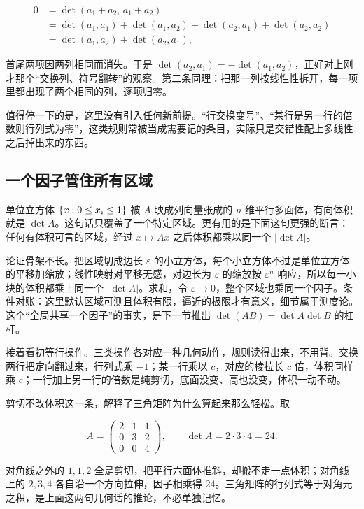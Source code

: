 \[
\begin{aligned}
0&=\det(a_1+a_2,\,a_1+a_2)\\
&=\det(a_1,a_1)+\det(a_1,a_2)+\det(a_2,a_1)+\det(a_2,a_2)\\
&=\det(a_1,a_2)+\det(a_2,a_1),
\end{aligned}
\]

首尾两项因两列相同而消失。于是 \(\det(a_2,a_1)=-\det(a_1,a_2)\)，正好对上刚才那个``交换列、符号翻转''的观察。第二条同理：把那一列按线性性拆开，每一项里都出现了两个相同的列，逐项归零。

值得停一下的是，这里没有引入任何新前提。``行交换变号''、``某行是另一行的倍数则行列式为零''，这类规则常被当成需要记的条目，实际只是交错性配上多线性之后掉出来的东西。

\subsection{一个因子管住所有区域}

单位立方体 \(\left\{x:0\le x_i\le1\right\}\) 被 \(A\) 映成列向量张成的 \(n\) 维平行多面体，有向体积就是 \(\det A\)。这句话只覆盖了一个特定区域。更有用的是下面这句更强的断言：任何有体积可言的区域，经过 \(x\mapsto Ax\) 之后体积都乘以同一个 \(|\det A|\)。

论证骨架不长。把区域切成边长 \(\varepsilon\) 的小立方体，每个小立方体不过是单位立方体的平移加缩放；线性映射对平移无感，对边长为 \(\varepsilon\) 的缩放按 \(\varepsilon^n\) 响应，所以每一小块的体积都乘上同一个 \(|\det A|\)。求和，令 \(\varepsilon\to0\)，整个区域也乘同一个因子。条件对账：这里默认区域可测且体积有限，逼近的极限才有意义，细节属于测度论。这个``全局共享一个因子''的事实，是下一节推出 \(\det(AB)=\det A\det B\) 的杠杆。

接着看初等行操作。三类操作各对应一种几何动作，规则读得出来，不用背。交换两行把定向翻过来，行列式乘 \(-1\)；某一行乘以 \(c\)，对应的棱拉长 \(c\) 倍，体积同样乘 \(c\)；一行加上另一行的倍数是纯剪切，底面没变、高也没变，体积一动不动。

剪切不改体积这一条，解释了三角矩阵为什么算起来那么轻松。取

\[
A=\begin{pmatrix}2&1&1\\0&3&2\\0&0&4\end{pmatrix},\qquad
\det A=2\cdot3\cdot4=24.
\]

对角线之外的 \(1,1,2\) 全是剪切，把平行六面体推斜，却搬不走一点体积；对角线上的 \(2,3,4\) 各自沿一个方向拉伸，因子相乘得 \(24\)。三角矩阵的行列式等于对角元之积，是上面这两句几何话的推论，不必单独记忆。

